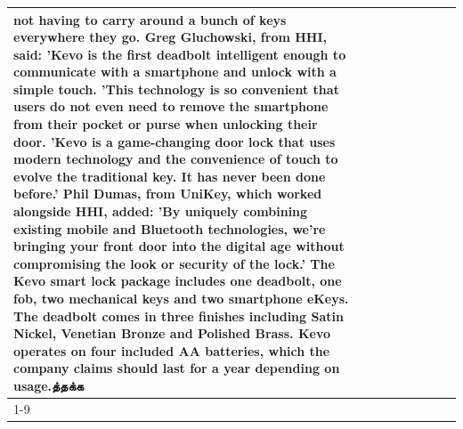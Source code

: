 \begin{table}[H]
\begin{tabular}{lllrlllll}
not having to carry around a bunch of keys everywhere they go. Greg Gluchowski, from HHI, said: 'Kevo is the first deadbolt intelligent enough to communicate with a smartphone and unlock with a simple touch. 'This technology is so convenient that users do not even need to remove the smartphone from their pocket or purse when unlocking their door. 'Kevo is a game-changing door lock that uses modern technology and the convenience of touch to evolve the traditional key. It has never been done before.' Phil Dumas, from UniKey, which worked alongside HHI, added: 'By uniquely combining existing mobile and Bluetooth technologies, we’re bringing your front door into the digital age without compromising the look or security of the lock.' The Kevo smart lock package includes one deadbolt, one fob, two mechanical keys and two smartphone eKeys. The deadbolt comes in three finishes including Satin Nickel, Venetian Bronze and Polished Brass. Kevo operates on four included AA batteries, which the company claims should last for a year depending on usage.த்தக்க \\
\cline{1-9}

\end{tabular}
\end{table}
